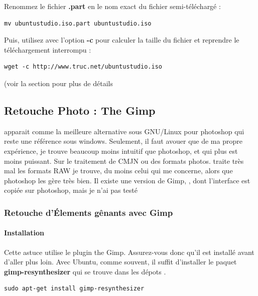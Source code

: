 \documentclass[a4paper,twoside]{article}
\begin{document}
Renommez le fichier \textbf{.part} en le nom exact du fichier semi-téléchargé :

\begin{verbatim}
mv ubuntustudio.iso.part ubuntustudio.iso
\end{verbatim}

Puis, utilisez  avec l'option \textbf{-c} pour calculer la taille du fichier et reprendre le téléchargement interrompu :

\begin{verbatim}
wget -c http://www.truc.net/ubuntustudio.iso
\end{verbatim}

(voir la section  pour plus de détails


\subsection{Retouche Photo : The Gimp}
 apparait comme la meilleure alternative sous GNU/Linux pour photoshop qui reste une référence sous windows. Seulement, il faut avouer que de ma propre expérience, je trouve  beaucoup moins intuitif que photoshop, et qui plus est moins puissant. Sur le traitement de CMJN ou des formats photos.  traite très mal les formats RAW je trouve, du moins celui qui me concerne, alors que photoshop les gère très bien. Il existe une version de Gimp, , dont l'interface est copiée sur photoshop, mais je n'ai pas testé

\subsubsection{Retouche d'Élements gênants avec Gimp}
\paragraph{Installation}

Cette astuce utilise le plugin  the Gimp. Assurez-vous donc qu'il est installé avant d'aller plus loin. Avec Ubuntu, comme souvent, il suffit d'installer le paquet \textbf{gimp-resynthesizer} qui se trouve dans les dépots .

\begin{verbatim}
sudo apt-get install gimp-resynthesizer
\end{verbatim}
\end{document}

